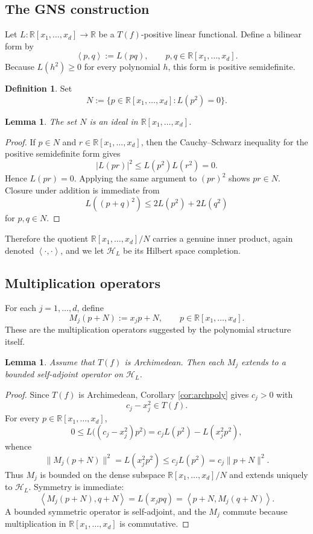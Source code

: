 \documentclass[11pt]{amsart}
\numberwithin{equation}{section}
\newtheorem{lemma}[theorem]{Lemma}
\theoremstyle{definition}
\newtheorem{definition}[theorem]{Definition}
\theoremstyle{remark}
\newcommand{\R}{\mathbb{R}}
\newcommand{\Hcal}{\mathcal{H}}
\newcommand{\Rxd}{\R[x_1,\dots,x_d]}
\newcommand{\ip}[2]{\left\langle #1,#2 \right\rangle}
\newcommand{\1}{\mathbf{1}}
\begin{document}
\subsection{The GNS construction}

Let \(L:\Rxd\to\R\) be a \(T(f)\)-positive linear functional. Define a bilinear form by
\[
\ip{p}{q}:=L(pq), \qquad p,q\in\Rxd.
\]
Because \(L(h^2)\ge 0\) for every polynomial \(h\), this form is positive semidefinite.

\begin{definition}
Set
\[
N:=\{p\in\Rxd: L(p^2)=0\}.
\]
\end{definition}

\begin{lemma}
The set \(N\) is an ideal in \(\Rxd\).
\end{lemma}

\begin{proof}
If \(p\in N\) and \(r\in\Rxd\), then the Cauchy--Schwarz inequality for the positive semidefinite form gives
\[
|L(pr)|^2\le L(p^2)L(r^2)=0.
\]
Hence \(L(pr)=0\). Applying the same argument to \((pr)^2\) shows \(pr\in N\). Closure under addition is immediate from
\[
L((p+q)^2)\le 2L(p^2)+2L(q^2)
\]
for \(p,q\in N\).
\end{proof}

Therefore the quotient \(\Rxd/N\) carries a genuine inner product, again denoted \(\ip{\cdot}{\cdot}\), and we let \(\Hcal_L\) be its Hilbert space completion.

\subsection{Multiplication operators}

For each \(j=1,\dots,d\), define
\[
M_j(p+N):=x_jp+N, \qquad p\in\Rxd.
\]
These are the multiplication operators suggested by the polynomial structure itself.

\begin{lemma}\label{lem:Mjbounded}
Assume that \(T(f)\) is Archimedean. Then each \(M_j\) extends to a bounded self-adjoint operator on \(\Hcal_L\).
\end{lemma}

\begin{proof}
Since \(T(f)\) is Archimedean, Corollary \ref{cor:archpoly} gives \(c_j>0\) with
\[
c_j-x_j^2\in T(f).
\]
For every \(p\in\Rxd\),
\[
0\le L\bigl((c_j-x_j^2)p^2\bigr)=c_jL(p^2)-L(x_j^2p^2),
\]
whence
\[
\|M_j(p+N)\|^2=L(x_j^2p^2)\le c_jL(p^2)=c_j\|p+N\|^2.
\]
Thus \(M_j\) is bounded on the dense subspace \(\Rxd/N\) and extends uniquely to \(\Hcal_L\). Symmetry is immediate:
\[
\ip{M_j(p+N)}{q+N}=L(x_jpq)=\ip{p+N}{M_j(q+N)}.
\]
A bounded symmetric operator is self-adjoint, and the \(M_j\) commute because multiplication in \(\Rxd\) is commutative.
\end{proof}
\end{document}
